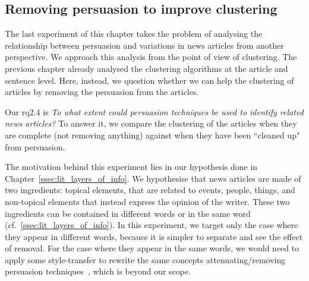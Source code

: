 
\subsection{\statusgreen Removing persuasion to improve clustering}
\label{ssec:lp_relationship_removing}

The last experiment of this chapter takes the problem of analysing the relationship between persuasion and variations in news articles from another perspective.
We approach this analysis from the point of view of clustering.
The previous chapter already analysed the clustering algorithms at the article and sentence level.
Here, instead, we question whether we can help the clustering of articles by removing the persuasion from the articles.

Our \acrshort{rq}2.4 is \emph{To what extent could persuasion techniques be used to identify related news articles?} To answer it, we compare the clustering of the articles when they are complete (not removing anything) against when they have been ``cleaned up" from persuasion.

The motivation behind this experiment lies in our hypothesis done in Chapter~\ref{ssec:lit_layers_of_info}. We hypothesise that news articles are made of two ingredients: topical elements, that are related to events, people, things, and non-topical elements that instead express the opinion of the writer. These two ingredients can be contained in different words or in the same word (cf.~\ref{ssec:lit_layers_of_info}). In this experiment, we target only the case where they appear in different words, because it is simpler to separate and see the effect of removal.
For the case where they appear in the same words, we would need to apply some style-transfer to rewrite the same concepts attenuating/removing persuasion techniques~\citep{bagdasaryan2022spinning}, which is beyond our scope. %




